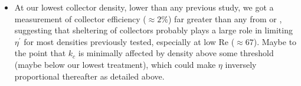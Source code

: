 \documentclass{article}
\begin{document}
\begin{itemize}
    \item At our lowest collector density, lower than any previous study, we got a measurement of collector efficiency ($\approx2\%$) far greater than any from \cite{Fauria_2015} or \cite{Purich_2007}, suggesting that sheltering of collectors probably plays a large role in limiting $\eta^\prime$ for most densities previously tested, especially at low Re ($\approx67$). Maybe to the point that $k_c$ is minimally affected by density above some threshold (maybe below our lowest treatment), which could make $\eta$ inversely proportional thereafter as detailed above.
\end{itemize}



\end{document}
